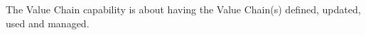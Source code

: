 %
%
The Value Chain capability is about having the Value Chain(s) defined, updated, used and managed.

